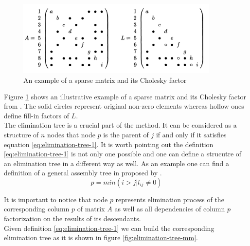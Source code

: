 \figpointer{\ref{fig:sparsity-pattern-example-mm}}

\begin{figure}[htpb]
  \centering
  \includegraphics[width=0.9\textwidth]{figures/chapter-2/sparsity-pattern-example-mm.png}
\caption{An example of a sparse matrix and its Cholesky factor \cite{mult-frontal-original:2}}
\label{fig:sparsity-pattern-example-mm}
\end{figure}


Figure \ref{fig:sparsity-pattern-example-mm} shows an illustrative example of a sparse matrix and its Cholesky factor from \cite{mult-frontal-original:2}. The solid circles represent original non-zero elements whereas hollow ones define fill-in factors of $L$. \\


The elimination tree is a crucial part of the method. It can be considered as a structure of $n$ nodes that node $p$ is the parent of $j$ if and only if it satisfies equation \ref{eq:elimination-tree-1}. It is worth pointing out the definition \ref{eq:elimination-tree-1} is not only one possible and one can define a strucutre of an elimination tree in a different way as well. As an example one can find a definition of a general assembly tree in \cite{mult-frontal-original:2} proposed by \citeauthor{mult-frontal-original:2}.\\

\begin{equation} \label{eq:elimination-tree-1}
	p = min(i > j | l_{ij} \neq 0)
\end{equation}


It is important to notice that node $p$ represents elimination process of the corresponding column $p$ of matrix $A$ as well as all dependencies of column $p$ factorization on the results of its descendants.\\


Given definition \ref{eq:elimination-tree-1} we can build the corresponding elimination tree as it is shown in figure \ref{fig:elimination-tree-mm}.\\



